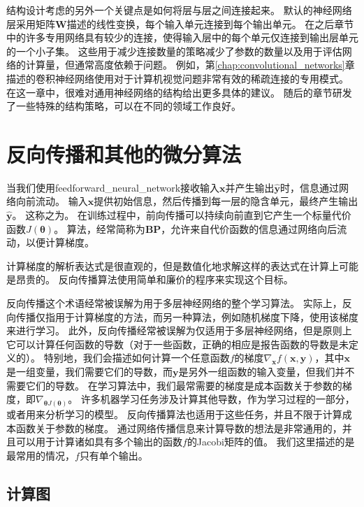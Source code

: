 结构设计考虑的另外一个关键点是如何将层与层之间连接起来。
默认的神经网络层采用矩阵$\bm{W}$描述的线性变换，每个输入单元连接到每个输出单元。
在之后章节中的许多专用网络具有较少的连接，使得输入层中的每个单元仅连接到输出层单元的一个小子集。
这些用于减少连接数量的策略减少了参数的数量以及用于评估网络的计算量，但通常高度依赖于问题。
例如，第\ref{chap:convolutional_networks}章描述的卷积神经网络使用对于计算机视觉问题非常有效的稀疏连接的专用模式。
在这一章中，很难对通用神经网络的结构给出更多具体的建议。
随后的章节研发了一些特殊的结构策略，可以在不同的领域工作良好。


\section{反向传播和其他的微分算法}
\label{sec:back_propagation_and_other_differentiation_algorithms}

当我们使用\gls{feedforward_neural_network}接收输入$\bm{x}$并产生输出$\hat{\bm{y}}$时，信息通过网络向前流动。
输入$\bm{x}$提供初始信息，然后传播到每一层的隐含单元，最终产生输出$\hat{\bm{y}}$。
这称之为。
在训练过程中，前向传播可以持续向前直到它产生一个标量代价函数$J(\bm{\theta})$。
算法\citep{RHW}，经常简称为\textbf{\glsdesc{BP}}，允许来自代价函数的信息通过网络向后流动，以便计算梯度。


计算梯度的解析表达式是很直观的，但是数值化地求解这样的表达式在计算上可能是昂贵的。
 反向传播算法使用简单和廉价的程序来实现这个目标。

反向传播这个术语经常被误解为用于多层神经网络的整个学习算法。
实际上，反向传播仅指用于计算梯度的方法，而另一种算法，例如随机梯度下降，使用该梯度来进行学习。
此外，反向传播经常被误解为仅适用于多层神经网络，但是原则上它可以计算任何函数的导数（对于一些函数，正确的相应是报告函数的导数是未定义的）。
特别地，我们会描述如何计算一个任意函数$f$的梯度$\nabla_{\bm{x}} f(\bm{x}, \bm{y})$，其中$\bm{x}$是一组变量，我们需要它们的导数，而$\bm{y}$是另外一组函数的输入变量，但我们并不需要它们的导数。
在学习算法中，我们最常需要的梯度是成本函数关于参数的梯度，即$\nabla_{\bm{\theta}J(\bm{\theta})}$。
许多机器学习任务涉及计算其他导数，作为学习过程的一部分，或者用来分析学习的模型。
反向传播算法也适用于这些任务，并且不限于计算成本函数关于参数的梯度。
通过网络传播信息来计算导数的想法是非常通用的，并且可以用于计算诸如具有多个输出的函数$f$的Jacobi矩阵的值。
我们这里描述的是最常用的情况，$f$只有单个输出。

\subsection{计算图}
\label{sec:computational_graphs}

